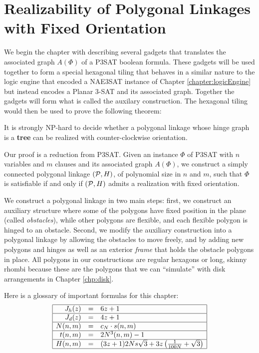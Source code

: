\chapter{Realizability of Polygonal Linkages with Fixed Orientation\label{chapter:polygonalLinkage}}

We begin the chapter with describing several gadgets that translates the associated graph $A(\Phi)$ of a P3SAT boolean formula.  
These gadgets will be used together to form a special hexagonal tiling that behaves in a similar nature to the logic engine that encoded a NAE3SAT instance of Chapter \ref{chapter:logicEngine} but instead encodes a Planar 3-SAT and its associated graph.
Together the gadgets will form what is called the auxilary construction.
The hexagonal tiling would then be used to prove the following theorem:
\begin{thm}\label{thm:hinge2}
It is strongly NP-hard to decide whether a polygonal linkage whose hinge graph is a \textbf{tree} can be realized with counter-clockwise orientation.
\end{thm}
Our proof is a reduction from P3SAT.
Given an instance $\Phi$ of P3SAT with $n$ variables and $m$ clauses and its associated graph $A(\Phi)$, we construct a simply connected polygonal linkage $({\cal P},H)$, of polynomial size in $n$ and $m$, such that $\Phi$ is satisfiable if and only if $({\cal P},H)$ admits a realization with fixed orientation. 

We construct a polygonal linkage in two main steps: first, we construct an auxiliary structure where some of the polygons have fixed position in the plane (called \emph{obstacles}), while other polygons are flexible, and each flexible polygon is hinged to an obstacle. 
Second, we modify the auxiliary construction into a polygonal linkage by allowing the obstacles to move freely, and by adding new polygons and hinges as well as an exterior \emph{frame} that holds the obstacle polygons in place.
All polygons in our constructions are regular hexagons or long, skinny rhombi because these are the polygons that we can ``simulate'' with disk arrangements in Chapter \ref{chp:disk}.

Here is a glossary of important formulas for this chapter:
$$
\begin{array}{|rcl|}
\hline
J_h (z) &=& 6z+1\\\hline
J_d (z) &=& 4z+1\\\hline
N(n,m)&=& c_N \cdot s(n,m)\\\hline
t(n,m)&=& 2 N^3(n,m)-1\\\hline
H(n,m) &=& (3z+1) 2 Ns\sqrt{3} + 3z \left( \frac{1}{100N} + \sqrt{3} \right)\\\hline
\end{array}
$$
